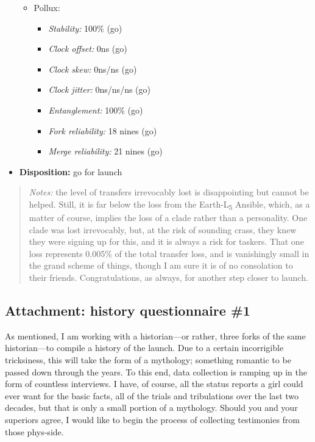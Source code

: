 \begin{itemize}
\begin{itemize}
    \pagebreak
  \item
    Pollux:

    \begin{itemize}
    \tightlist
    \item
      \emph{Stability:} 100\% (go)
    \item
      \emph{Clock offset:} 0ns (go)
    \item
      \emph{Clock skew:} 0ns/ns (go)
    \item
      \emph{Clock jitter:} 0ns/ns/ns (go)
    \item
      \emph{Entanglement:} 100\% (go)
    \item
      \emph{Fork reliability:} 18 nines (go)
    \item
      \emph{Merge reliability:} 21 nines (go)
    \end{itemize}
  \end{itemize}
\item
  \textbf{Disposition:} go for launch
\end{itemize}

\vspace{-0.5em}

\begin{quote}
\emph{Notes:} the level of transfers irrevocably lost is disappointing but cannot be helped. Still, it is far below the loss from the Earth-L\textsubscript{5} Ansible, which, as a matter of course, implies the loss of a clade rather than a personality. One clade was lost irrevocably, but, at the risk of sounding crass, they knew they were signing up for this, and it is always a risk for taskers. That one loss represents 0.005\% of the total transfer loss, and is vanishingly small in the grand scheme of things, though I am sure it is of no consolation to their friends. Congratulations, as always, for another step closer to launch.
\end{quote}

\hypertarget{attachment-history-questionnaire-1}{%
\subsection*{Attachment: history questionnaire \#1}\label{attachment-history-questionnaire-1}}

As mentioned, I am working with a historian---or rather, three forks of the same historian---to compile a history of the launch. Due to a certain incorrigible tricksiness, this will take the form of a mythology; something romantic to be passed down through the years. To this end, data collection is ramping up in the form of countless interviews. I have, of course, all the status reports a girl could ever want for the basic facts, all of the trials and tribulations over the last two decades, but that is only a small portion of a mythology. Should you and your superiors agree, I would like to begin the process of collecting testimonies from those phys-side.

